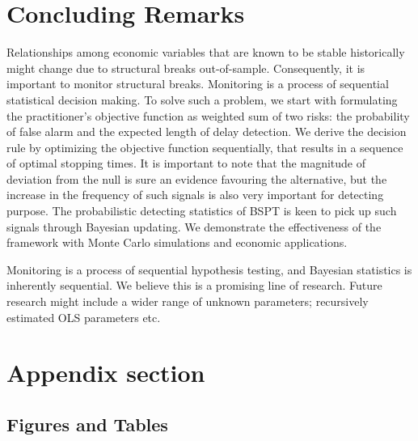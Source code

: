 \documentclass[preprint,authoryear,12pt,english]{elsarticle}
\theoremstyle{plain}
\begin{document}
\section{Concluding Remarks}\label{sec:conclusion}
Relationships among economic variables that are known to be stable historically might change due to structural breaks out-of-sample. Consequently, it is important to monitor structural breaks. Monitoring is a process of sequential statistical decision making. To solve such a problem, we start with formulating the practitioner's objective function as weighted sum of two risks: the probability of false alarm and the expected length of delay detection. We derive the decision rule by optimizing the objective function sequentially, that results in a sequence of optimal stopping times. It is important to note that the magnitude of deviation from the null is sure an evidence favouring the alternative, but the increase in the frequency of such signals is also very important for detecting purpose. The probabilistic detecting statistics of BSPT is keen to pick up such signals through Bayesian updating. We demonstrate the effectiveness of the framework with Monte Carlo simulations and economic applications.

Monitoring is a process of sequential hypothesis testing, and Bayesian statistics is inherently sequential. We believe this is a promising line of research. Future research might include a wider range of unknown parameters; recursively estimated OLS parameters etc.

\section{Appendix section}\label{app}
\subsection{Figures and Tables}






\end{document}
